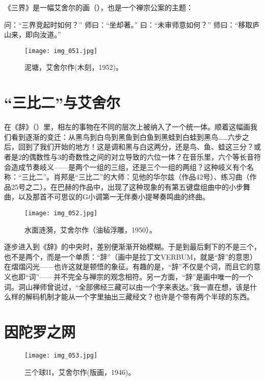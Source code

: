 《三界》是一幅艾舍尔的画（），也是一个禅宗公案的主题：

\begin{zenkoan}
问：“三界竞起时如何？”
师曰：“坐却著。”
曰：“未审师意如何？”
师曰：“移取庐山来，即向汝道。”
\end{zenkoan}

\begin{figure}
\texttt{[image: img\_051.jpg]}
\caption[泥塘，艾舍尔作。]
  {泥塘，艾舍尔作(木刻，1952)。}
\end{figure}

\section{“三比二”与艾舍尔}

在《辞》（）里，相左的事物在不同的层次上被纳入了一个统一体。顺着这幅画我们看到逐渐的变迁：从黑鸟到白鸟到黑鱼到白鱼到黑蛙到白蛙到黑鸟……六步之后，回到了我们开始的地方！这是调和黑与白这两分，还是鸟、鱼、蛙这三分？或者是2的偶数性与3的奇数性之间的对立导致的六位一体？在音乐里，六个等长音符会造成节奏岐义——是两个一组的三组，还是三个一组的两组？这种岐义有个名称：“三比二”。肖邦是“三比二”的大师：见他的华尔兹（作品42号）、练习曲（作品25号之二）。在巴赫的作品中，出现了这种现象的有第五键盘组曲中的小步舞曲，以及那首不可思议的G小调第一无伴奏小提琴奏鸣曲的终曲。

\begin{figure}
\texttt{[image: img\_052.jpg]}
\caption[水面涟漪，艾舍尔作。]
  {水面涟漪，艾舍尔作（油毡浮雕，1950）。}
\end{figure}

逐步进入到《辞》的中央时，差别便渐渐开始模糊。于是到最后剩下的不是三个，也不是两个，而是一个单质：“辞”（画中是拉丁文VERBUM，就是“辞”的意思）在熠熠闪光——也许这就是顿悟的象征。有趣的是，“辞”不仅是个词，而且它的意义也即“词”——并不完全与禅宗的观念相符。另一方面，“辞”是画中唯一的一个词。洞山禅师曾说过，“全部佛经三藏可以由一个字来表达。”我一直在想，该是什么样的解码机制才能从一个字里抽出三藏经文？也许是个带有两个半球的东西。

\section{因陀罗之网}

\begin{figure}
\texttt{[image: img\_053.jpg]}
\caption[三个球II，艾舍尔作。]
  {三个球II，艾舍尔作(版画，1946)。}
\end{figure}

